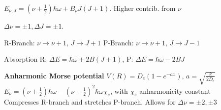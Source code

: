 \begin{squishlist}
    \item $E_{\nu, J} = (\nu + \frac{1}{2}) \hbar \omega + B_{\nu} J(J+1)$. Higher contrib. from $\nu$
    \item $\Delta \nu = \pm 1, \Delta J = \pm 1$.
    \item R-Branch: $\nu \rightarrow \nu + 1,\, J \rightarrow J+1$ \quad P-Branch:  $\nu \rightarrow \nu + 1, \,  J \rightarrow J-1$
    \item Absorption \quad R: $\Delta E = \hbar \omega + 2B(J+1)$, P: $\Delta E = \hbar \omega - 2BJ$
    \item \textbf{Anharmonic Morse potential} $V(R) = D_e (1 - e^{-ax}), \, a = \sqrt{\frac{k}{2D_e}}$ \\
    $E_{\nu} = (\nu+\frac{1}{2}) \hbar \omega - (\nu - \frac{1}{2})^2 \hbar \omega \chi_e$, with $\chi_e$ anharmonicity constant \\
    Compresses R-branch and stretches P-branch. Allows for $\Delta \nu = \pm 2, \pm 3$
\end{squishlist}

